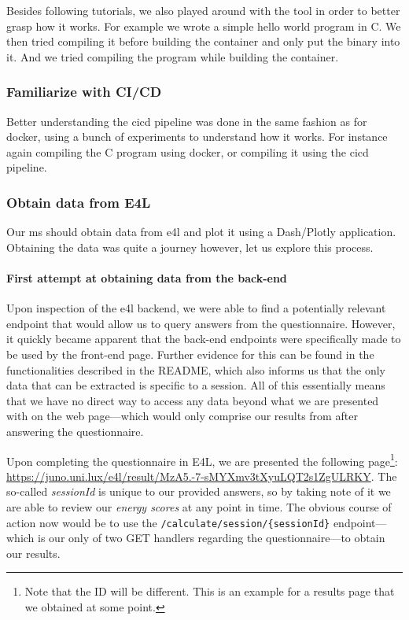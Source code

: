 Besides following tutorials, we also played around with the tool in
order to better grasp how it works. For example we wrote a simple
hello world program in C. We then tried compiling it before building
the container and only put the binary into it. And we tried compiling
the program while building the container.

\subsubsection{Familiarize with CI/CD}

Better understanding the \gls{cicd} pipeline was done in the same
fashion as for docker, using a bunch of experiments to understand how
it works. For instance again compiling the C program using docker, or
compiling it using the \gls{cicd} pipeline.

\subsubsection{Obtain data from E4L}

Our \gls{ms} should obtain data from \gls{e4l} and plot it using
a Dash/Plotly application. Obtaining the data was quite a journey
however, let us explore this process.

\paragraph{First attempt at obtaining data from the back-end}

Upon inspection of the \gls{e4l} backend, we were able to find a
potentially relevant endpoint that would allow us to query answers
from the questionnaire.  However, it quickly became apparent that the
back-end endpoints were specifically made to be used by the front-end
page. Further evidence for this can be found in the functionalities
described in the README, which also informs us that the only data that
can be extracted is specific to a session. All of this essentially
means that we have no direct way to access any data beyond what we are
presented with on the web page---which would only comprise our results
from after answering the questionnaire.

Upon completing the questionnaire in E4L, we are presented the
following page\footnote{Note that the ID will be different. This is an
example for a results page that we obtained at some point.}:
\url{https://juno.uni.lux/e4l/result/MzA5.-7-sMYXmv3tXyuLQT2s1ZgULRKY}.
The so-called	\textit{sessionId} is unique to our provided answers, so
by taking note of it we are able to review our \textit{energy scores}
at any point in time. The obvious course of action now would be to use
the \verb|/calculate/session/{sessionId}| endpoint---which is our only
of two GET handlers regarding the questionnaire---to obtain our
results.

